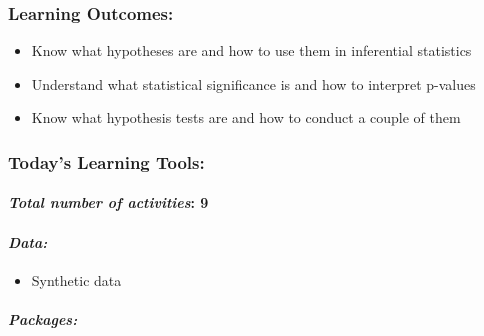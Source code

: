 \documentclass[
]{book}
\providecommand{\tightlist}{%
  \setlength{\itemsep}{0pt}\setlength{\parskip}{0pt}}
\begin{document}
\hypertarget{learning-outcomes-5}{%
\subsubsection*{Learning Outcomes:}\label{learning-outcomes-5}}

\begin{itemize}
\tightlist
\item
  Know what hypotheses are and how to use them in inferential statistics
\item
  Understand what statistical significance is and how to interpret p-values
\item
  Know what hypothesis tests are and how to conduct a couple of them
\end{itemize}

\hypertarget{todays-learning-tools-5}{%
\subsubsection*{Today's Learning Tools:}\label{todays-learning-tools-5}}

\hypertarget{total-number-of-activities-9-1}{%
\paragraph*{\texorpdfstring{\emph{Total number of activities}: 9}{Total number of activities: 9}}\label{total-number-of-activities-9-1}}

\hypertarget{data-5}{%
\paragraph*{\texorpdfstring{\emph{Data:}}{Data:}}\label{data-5}}

\begin{itemize}
\tightlist
\item
  Synthetic data
\end{itemize}

\hypertarget{packages-6}{%
\paragraph*{\texorpdfstring{\emph{Packages:}}{Packages:}}\label{packages-6}}
\end{document}
